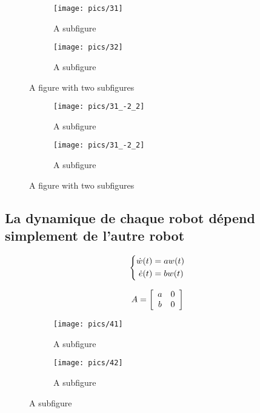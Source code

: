 \documentclass[utf8]{article}
\begin{document}
\begin{figure}
\centering
\begin{subfigure}{.5\textwidth}
  \centering
  \texttt{[image: pics/31]}
  \caption{A subfigure}
\end{subfigure}%
\begin{subfigure}{.5\textwidth}
  \centering
  \texttt{[image: pics/32]}
  \caption{A subfigure}
\end{subfigure}
\caption{A figure with two subfigures}
\end{figure}

\begin{figure}
\centering
  \begin{subfigure}{.5\textwidth}
  \centering
  \texttt{[image: pics/31\_-2\_2]}
  \caption{A subfigure}
\end{subfigure}%
\begin{subfigure}{.5\textwidth}
  \centering
  \texttt{[image: pics/31\_-2\_2]}
  \caption{A subfigure}
\end{subfigure}
\caption{A figure with two subfigures}
\end{figure}

\newpage

\subsection{La dynamique de chaque robot dépend simplement de l’autre
robot}

\begin{equation}
\centering
\left\{\begin{split}
\dot{w}(t) &= aw(t) \\
\dot{e}(t) &= bw(t) \\
\end{split}\right.
 \end{equation}

\begin{equation}
\centering
A = \left[
\begin{array}{cc}
a & 0\\
b & 0
\end{array}
\right]
 \end{equation}

\begin{figure}
\centering
\begin{subfigure}{.5\textwidth}
  \centering
  \texttt{[image: pics/41]}
  \caption{A subfigure}
\end{subfigure}%
\begin{subfigure}{.5\textwidth}
  \centering
  \texttt{[image: pics/42]}
  \caption{A subfigure}
\end{subfigure}
\end{figure}
\end{document}
